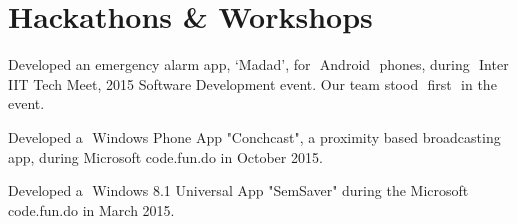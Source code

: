 \section{Hackathons \& Workshops}

\begin{tightitemize}
 \item Developed an emergency alarm app, ‘Madad’, for ​ Android ​ phones, during ​ Inter IIT Tech Meet, 2015 
Software Development event. Our team stood ​ first ​ in the event. 
  \item Developed a ​ Windows Phone App​  "Conchcast", a proximity based broadcasting app, during Microsoft 
code.fun.do in October 2015. 
\item Developed a ​ Windows 8.1 Universal App​  "Sem­Saver" during the Microsoft code.fun.do in March 2015. 
\end{tightitemize}
